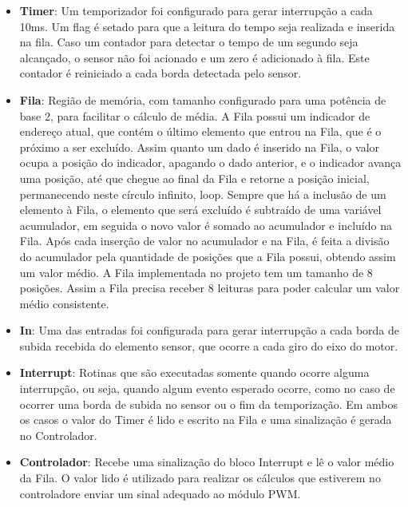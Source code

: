 \begin{itemize}

\item \textbf{Timer}: Um temporizador foi configurado para gerar interrupção a cada 10ms. 
Um flag é setado para que a leitura do tempo seja realizada e inserida na fila.
Caso um contador para detectar o tempo de um segundo seja alcançado, o sensor não foi acionado e um zero é adicionado à fila. 
Este contador é reiniciado a cada borda detectada pelo sensor.

\item \textbf{Fila}: Região de memória, com tamanho configurado para uma potência de base 2, para facilitar o cálculo de média. 
A Fila possui um indicador de endereço atual, que contém o último elemento que entrou na Fila, que é o próximo a ser excluído. Assim quanto um dado é inserido na Fila, o valor ocupa a posição do indicador, apagando o dado anterior, e o indicador avança uma posição, até que chegue ao final da Fila e retorne a posição inicial, permanecendo neste círculo infinito, loop. 
Sempre que há a inclusão de um elemento à Fila, o elemento que será excluído é subtraído de uma variável acumulador, em seguida o novo valor é somado ao acumulador e incluído na Fila. 
Após cada inserção de valor no acumulador e na Fila, é feita a divisão do acumulador pela quantidade de posições que a Fila possui, obtendo assim um valor médio. 
A Fila implementada no projeto tem um tamanho de 8 posições. Assim a Fila precisa receber 8 leituras para poder calcular um valor médio consistente. 


\item \textbf{In}: Uma das entradas foi configurada para gerar interrupção a cada borda de subida recebida do elemento sensor, que ocorre a cada giro do eixo do motor. 


\item \textbf{Interrupt}: Rotinas que são executadas somente quando ocorre alguma interrupção, ou seja, quando algum evento esperado ocorre, como no caso de ocorrer uma borda de subida no sensor ou o fim da temporização. 
Em ambos os casos o valor do Timer é lido e escrito na Fila e uma sinalização é gerada no Controlador. 



\item \textbf{Controlador}: Recebe uma sinalização do bloco Interrupt e lê o valor médio da Fila. 
O valor lido é utilizado para realizar os cálculos que estiverem no controladore enviar um sinal adequado ao módulo PWM.



\end{itemize}
